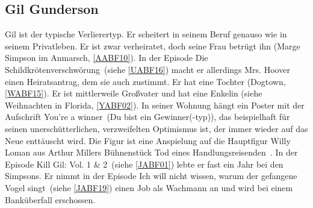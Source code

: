 {\subsection{Gil Gunderson}\label{GilGunderson}
Gil ist der typische Verlierertyp. Er scheitert in seinem Beruf genauso wie in seinem Privatleben. Er ist zwar verheiratet, doch seine Frau betrügt ihn (\glqq Marge Simpson im Anmarsch\grqq, \ref{AABF10}). In der Episode \glqq Die Schildkrötenverschwörung\grqq\ (siehe \ref{UABF16}) macht er allerdings Mrs. Hoover einen Heiratsantrag, dem sie auch zustimmt. Er hat eine Tochter (\glqq Dogtown\grqq, \ref{WABF15}). Er ist mittlerweile Großvater und hat eine Enkelin (siehe \glqq Weihnachten in Florida\grqq, \ref{YABF02}). In seiner Wohnung hängt ein Poster mit der Aufschrift \glqq You're a winner\grqq\ (\glqq Du bist ein Gewinner(-typ)\grqq ), das beispielhaft für seinen unerschütterlichen, verzweifelten Optimismus ist, der immer wieder auf das Neue enttäuscht wird. Die Figur ist eine Anspielung auf die Hauptfigur Willy Loman aus Arthur Millers Bühnenstück \glqq Tod eines Handlungsreisenden\grqq\ \cite{Wikipedia}. In der Episode \glqq Kill Gil: Vol. 1 \& 2\grqq\ (siehe \ref{JABF01}) lebte er fast ein Jahr bei den Simpsons. Er nimmt in der Episode \glqq Ich will nicht wissen, warum der gefangene Vogel singt\grqq\ (siehe \ref{JABF19}) einen Job als Wachmann an und wird bei einem Banküberfall erschossen.

}

